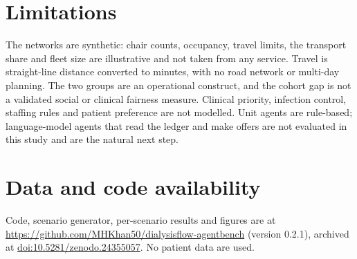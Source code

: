 \documentclass[11pt,a4paper]{article}
\begin{document}
\section{Limitations}
The networks are synthetic: chair counts, occupancy, travel limits, the transport share and fleet size are
illustrative and not taken from any service. Travel is straight-line distance converted to minutes, with no
road network or multi-day planning. The two groups are an operational construct, and the cohort gap is not a
validated social or clinical fairness measure. Clinical priority, infection control, staffing rules and
patient preference are not modelled. Unit agents are rule-based; language-model agents that read the ledger and make offers are not evaluated in
this study and are the natural next step.

\section*{Data and code availability}
Code, scenario generator, per-scenario results and figures are at
\url{https://github.com/MHKhan50/dialysisflow-agentbench} (version 0.2.1), archived at \href{https://doi.org/10.5281/zenodo.24355057}{doi:10.5281/zenodo.24355057}. No patient data are used.



\end{document}
